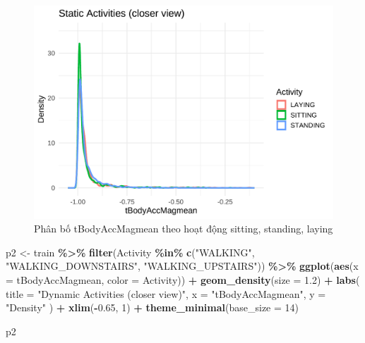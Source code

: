 \documentclass[
]{article}
\newenvironment{Shaded}{\begin{snugshade}}{\end{snugshade}}
\newcommand{\AttributeTok}[1]{\textcolor[rgb]{0.13,0.29,0.53}{#1}}
\newcommand{\DecValTok}[1]{\textcolor[rgb]{0.00,0.00,0.81}{#1}}
\newcommand{\FloatTok}[1]{\textcolor[rgb]{0.00,0.00,0.81}{#1}}
\newcommand{\FunctionTok}[1]{\textcolor[rgb]{0.13,0.29,0.53}{\textbf{#1}}}
\newcommand{\NormalTok}[1]{#1}
\newcommand{\OtherTok}[1]{\textcolor[rgb]{0.56,0.35,0.01}{#1}}
\newcommand{\SpecialCharTok}[1]{\textcolor[rgb]{0.81,0.36,0.00}{\textbf{#1}}}
\newcommand{\StringTok}[1]{\textcolor[rgb]{0.31,0.60,0.02}{#1}}
\begin{document}
\begin{figure}
\centering
\includegraphics{report_files/figure-latex/unnamed-chunk-14-1.pdf}
\caption{Phân bố tBodyAccMagmean theo hoạt động sitting, standing,
laying}
\end{figure}

\begin{Shaded}
\begin{Highlighting}[]
\NormalTok{p2 }\OtherTok{\textless{}{-}}\NormalTok{ train }\SpecialCharTok{\%\textgreater{}\%}
  \FunctionTok{filter}\NormalTok{(Activity }\SpecialCharTok{\%in\%} \FunctionTok{c}\NormalTok{(}\StringTok{"WALKING"}\NormalTok{, }\StringTok{"WALKING\_DOWNSTAIRS"}\NormalTok{, }\StringTok{"WALKING\_UPSTAIRS"}\NormalTok{)) }\SpecialCharTok{\%\textgreater{}\%}
  \FunctionTok{ggplot}\NormalTok{(}\FunctionTok{aes}\NormalTok{(}\AttributeTok{x =}\NormalTok{ tBodyAccMagmean, }\AttributeTok{color =}\NormalTok{ Activity)) }\SpecialCharTok{+}
  \FunctionTok{geom\_density}\NormalTok{(}\AttributeTok{size =} \FloatTok{1.2}\NormalTok{) }\SpecialCharTok{+}
  \FunctionTok{labs}\NormalTok{(}
    \AttributeTok{title =} \StringTok{"Dynamic Activities (closer view)"}\NormalTok{,}
    \AttributeTok{x =} \StringTok{"tBodyAccMagmean"}\NormalTok{,}
    \AttributeTok{y =} \StringTok{"Density"}
\NormalTok{  ) }\SpecialCharTok{+} \FunctionTok{xlim}\NormalTok{(}\SpecialCharTok{{-}}\FloatTok{0.65}\NormalTok{, }\DecValTok{1}\NormalTok{) }\SpecialCharTok{+}
  \FunctionTok{theme\_minimal}\NormalTok{(}\AttributeTok{base\_size =} \DecValTok{14}\NormalTok{)}

\NormalTok{p2}
\end{Highlighting}
\end{Shaded}
\end{document}
